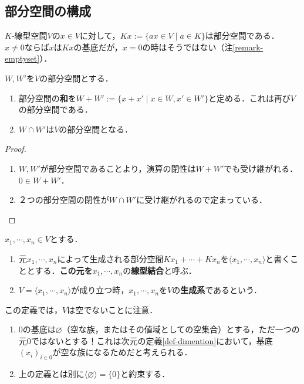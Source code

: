 \documentclass[uplatex, dvipdfmx]{jsreport}
\begin{document}
\subsection{部分空間の構成}\label{section-construction-of-subspaces}

\begin{definition}[元が生成する部分空間]
    $K$-線型空間$V$の$x\in V$に対して，$Kx:=\{ax\in V\mid a\in K\}$は部分空間である．
    $x\ne 0$ならば$x$は$Kx$の基底だが，$x=0$の時はそうではない（注\ref{remark-emptyset}）．
\end{definition}

\begin{proposition}
    $W,W'$を$V$の部分空間とする．
    \begin{enumerate}
        \item 部分空間の\textbf{和}を$W+W':=\{x+x'\mid x\in W,x'\in W'\}$と定める．これは再び$V$の部分空間である．
        \item $W\cap  W'$は$V$の部分空間となる．
    \end{enumerate}
\end{proposition}
\begin{proof}
    \begin{enumerate}
        \item $W,W'$が部分空間であることより，演算の閉性は$W+W'$でも受け継がれる．$0\in W+W'$．
        \item ２つの部分空間の閉性が$W\cap W'$に受け継がれるので定まっている．
    \end{enumerate}
\end{proof}

\begin{definition}\label{def-generator}
    $x_1,\cdots,x_n\in V$とする．
    \begin{enumerate}
        \item 元$x_1,\cdots,x_n$によって生成される部分空間$Kx_1+\cdots+Kx_n$を$\langle x_1,\cdots,x_n\rangle$と書くこととする．\textbf{この元を}$x_1,\cdots,x_n$の\textbf{線型結合}と呼ぶ．
        \item $V=\langle x_1,\cdots,x_n\rangle$が成り立つ時，$x_1,\cdots,x_n$を$V$の\textbf{生成系}であるという．
    \end{enumerate}
\end{definition}
\begin{remark}[空集合の場合]\label{remark-emptyset}
    この定義では，$V$は空でないことに注意．
    \begin{enumerate}
        \item $0$の基底は$\varnothing$（空な族，またはその値域としての空集合）とする，ただ一つの元$0$ではないとする！これは次元の定義\ref{def-dimention}において，基底$(x_i)_{i\in 0}$が空な族になるためだと考えられる．
        \item 上の定義とは別に$\langle\varnothing\rangle=\{0\}$と約束する．
    \end{enumerate}
\end{remark}
\end{document}
